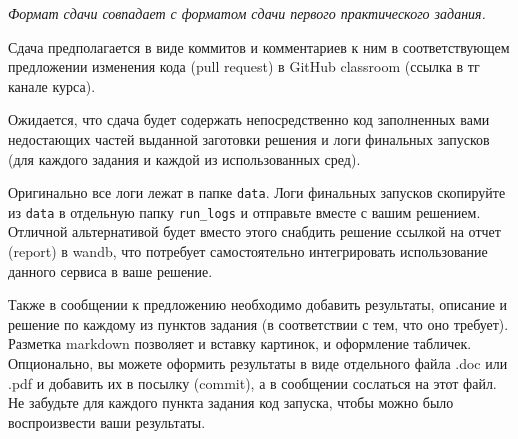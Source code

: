 \documentclass[12pt, oneside]{article}
\begin{document}
\textit{Формат сдачи совпадает с форматом сдачи первого практического задания.}

Сдача предполагается в виде коммитов и комментариев к ним в соответствующем предложении изменения кода (pull request) в GitHub classroom (ссылка в тг канале курса).

Ожидается, что сдача будет содержать непосредственно код заполненных вами недостающих частей выданной заготовки решения и логи финальных запусков (для каждого задания и каждой из использованных сред).

Оригинально все логи лежат в папке \verb|data|. Логи финальных запусков скопируйте из \verb|data| в отдельную папку \verb|run_logs| и отправьте вместе с вашим решением. Отличной альтернативой будет вместо этого снабдить решение ссылкой на отчет (report) в wandb, что потребует самостоятельно интегрировать использование данного сервиса в ваше решение.

Также в сообщении к предложению необходимо добавить результаты, описание и решение по каждому из пунктов задания (в соответствии с тем, что оно требует). Разметка markdown позволяет и вставку картинок, и оформление табличек. Опционально, вы можете оформить результаты в виде отдельного файла .doc или .pdf и добавить их в посылку (commit), а в сообщении сослаться на этот файл. Не забудьте для каждого пункта задания код запуска, чтобы можно было воспроизвести ваши результаты.
\end{document}
